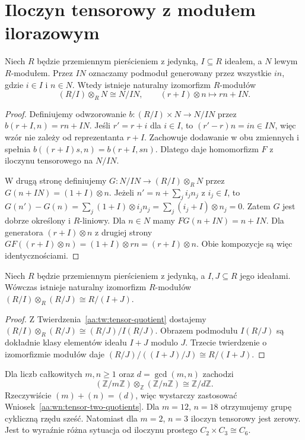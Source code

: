 \section{Iloczyn tensorowy z modułem ilorazowym}
\begin{twierdzenie}
\label{aa:tw:tensor-quotient}
Niech $R$ będzie przemiennym pierścieniem z jedynką,
$I\subseteq R$ ideałem, a $N$ lewym $R$-modułem.
Przez $IN$ oznaczamy podmoduł generowany przez wszystkie
$in$, gdzie $i\in I$ i $n\in N$. Wtedy istnieje naturalny
izomorfizm $R$-modułów
\[
 (R/I)\otimes_R N\cong N/IN,
 \qquad (r+I)\otimes n\longmapsto rn+IN.
\]
\end{twierdzenie}
\begin{proof}
Definiujemy odwzorowanie $b:(R/I)\times N\to N/IN$
przez $b(r+I,n)=rn+IN$. Jeśli $r'=r+i$ dla $i\in I$,
to $(r'-r)n=in\in IN$, więc wzór nie zależy od
reprezentanta $r+I$. Zachowuje dodawanie w obu
zmiennych i spełnia $b((r+I)s,n)=b(r+I,sn)$.
Dlatego daje homomorfizm $F$ z iloczynu tensorowego
na $N/IN$.

W drugą stronę definiujemy $G:N/IN\to (R/I)\otimes_RN$
przez $G(n+IN)=(1+I)\otimes n$.
Jeżeli $n'=n+\sum_j i_j n_j$ z $i_j\in I$, to
$G(n')-G(n)=\sum_j(1+I)\otimes i_jn_j
=\sum_j(i_j+I)\otimes n_j=0$.
Zatem $G$ jest dobrze określony i $R$-liniowy.
Dla $n\in N$ mamy $FG(n+IN)=n+IN$.
Dla generatora $(r+I)\otimes n$ z drugiej strony
$GF((r+I)\otimes n)=(1+I)\otimes rn
=(r+I)\otimes n$.
Obie kompozycje są więc identycznościami.
\end{proof}

\begin{wniosek}
\label{aa:wn:tensor-two-quotients}
Niech $R$ będzie przemiennym pierścieniem z jedynką,
a $I,J\subseteq R$ jego ideałami. Wówczas istnieje
naturalny izomorfizm $R$-modułów
$(R/I)\otimes_R(R/J)\cong R/(I+J)$.
\end{wniosek}
\begin{proof}
Z Twierdzenia~\ref{aa:tw:tensor-quotient} dostajemy
$(R/I)\otimes_R(R/J)\cong(R/J)/I(R/J)$.
Obrazem podmodułu $I(R/J)$ są dokładnie klasy
elementów ideału $I+J$ modulo $J$.
Trzecie twierdzenie o izomorfizmie modułów daje
$(R/J)/((I+J)/J)\cong R/(I+J)$.
\end{proof}

\begin{przyklad}
\label{aa:prz:tensor-cyclic}
Dla liczb całkowitych $m,n\ge1$ oraz $d=\gcd(m,n)$
zachodzi
\[
 (\mathbb Z/m\mathbb Z)\otimes_{\mathbb Z}
 (\mathbb Z/n\mathbb Z)\cong \mathbb Z/d\mathbb Z.
\]
Rzeczywiście $(m)+(n)=(d)$, więc wystarczy
zastosować Wniosek~\ref{aa:wn:tensor-two-quotients}.
Dla $m=12$, $n=18$ otrzymujemy grupę cykliczną
rzędu sześć. Natomiast dla $m=2$, $n=3$ iloczyn
tensorowy jest zerowy. Jest to wyraźnie różna sytuacja
od iloczynu prostego $C_2\times C_3\cong C_6$.
\end{przyklad}

